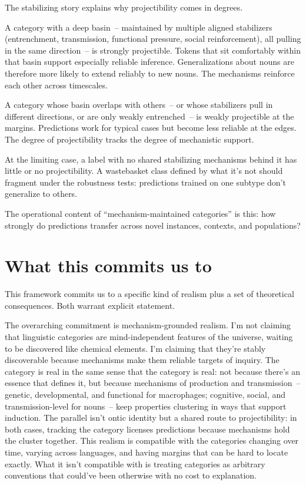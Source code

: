 The stabilizing story explains why projectibility comes in degrees.

A category with a deep basin~-- maintained by multiple aligned stabilizers (entrenchment, transmission, functional pressure, social reinforcement), all pulling in the same direction~-- is strongly projectible. Tokens that sit comfortably within that basin support especially reliable inference. Generalizations about nouns are therefore more likely to extend reliably to new nouns. The mechanisms reinforce each other across timescales.

A category whose basin overlaps with others~-- or whose stabilizers pull in different directions, or are only weakly entrenched~-- is weakly projectible at the margins. Predictions work for typical cases but become less reliable at the edges. The degree of projectibility tracks the degree of mechanistic support.

At the limiting case, a label with no shared stabilizing mechanisms behind it has little or no projectibility. A wastebasket class defined by what it's not should fragment under the robustness tests: predictions trained on one subtype don't generalize to others.

The operational content of \enquote{mechanism-maintained categories} is this: how strongly do predictions transfer across novel instances, contexts, and populations?


\section{What this commits us to}
\label{sec:6:commitments}

This framework commits us to a specific kind of realism plus a set of theoretical consequences. Both warrant explicit statement.

The overarching commitment is mechanism-grounded realism. I'm not claiming that linguistic categories are mind-independent features of the universe, waiting to be discovered like chemical elements. I'm claiming that they're stably discoverable because mechanisms make them reliable targets of inquiry. The category  is real in the same sense that the category  is real: not because there's an essence that defines it, but because mechanisms of production and transmission~-- genetic, developmental, and functional for macrophages; cognitive, social, and transmission-level for nouns~-- keep properties clustering in ways that support induction. The parallel isn't ontic identity but a shared route to projectibility: in both cases, tracking the category licenses predictions because mechanisms hold the cluster together. This realism is compatible with the categories changing over time, varying across languages, and having margins that can be hard to locate exactly. What it isn't compatible with is treating categories as arbitrary conventions that could've been otherwise with no cost to explanation.

